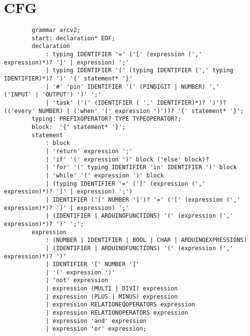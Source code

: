 \section{CFG}
\begin{listing}[htb!]
    \begin{verbatim}
        grammar arcv2;
        start: declaration* EOF;
        declaration
            : typing IDENTIFIER '=' ('[' (expression (',' expression)*)? ']' | expression) ';'
            | typing IDENTIFIER '(' (typing IDENTIFIER (',' typing IDENTIFIER)*)? ')' '{' statement* '}'
            | '#' 'pin' IDENTIFIER '(' (PINDIGIT | NUMBER) ',' ('INPUT' | 'OUTPUT') ')' ';'
            | 'task' ('(' (IDENTIFIER ( ',' IDENTIFIER)*)? ')')? (('every' NUMBER) | ('when' '(' expression ')'))? '{' statement* '}';
        typing: PREFIXOPERATOR? TYPE TYPEOPERATOR?;
        block:  '{' statement* '}';
        statement
            : block
            | 'return' expression ';'
            | 'if' '(' expression ')' block ('else' block)?
            | 'for' '(' typing IDENTIFIER 'in' IDENTIFIER ')' block
            | 'while' '(' expression ')' block
            | (typing IDENTIFIER '=' ('[' (expression (',' expression)*)? ']' | expression) ';')
            | IDENTIFIER ('[' NUMBER ']')? '=' ('[' (expression (',' expression)*)? ']' | expression) ';'
            | (IDENTIFIER | ARDUINOFUNCTIONS) '(' (expression (',' expression)*)? ')' ';';
        expression
            : (NUMBER | IDENTIFIER | BOOL | CHAR | ARDUINOEXPRESSIONS)
            | (IDENTIFIER | ARDUINOFUNCTIONS) '(' (expression (',' expression)*)? ')'
            | IDENTIFIER '[' NUMBER ']'
            | '(' expression ')'
            | 'not' expression
            | expression (MULTI | DIVI) expression
            | expression (PLUS | MINUS) expression
            | expression RELATIONEQOPERATORS expression
            | expression RELATIONOPERATORS expression
            | expression 'and' expression
            | expression 'or' expression;
    \end{verbatim}
\end{listing}